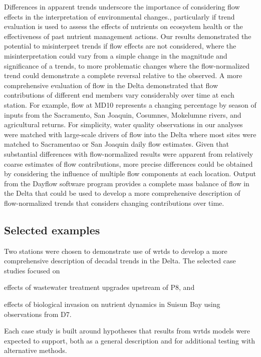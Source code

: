 \documentclass[journal = esthag, manuscript = article]{achemso}\usepackage[]{graphicx}\usepackage[]{color}
\begin{document}
Differences in apparent trends underscore the importance of considering flow effects in the interpretation of environmental changes., particularly if trend evaluation is used to assess the effects of nutrients on ecosystem health or the effectiveness of past nutrient management actions.  Our results demonstrated the potential to misinterpret trends if flow effects are not considered, where the misinterpretation could vary from a simple change in the magnitude and significance of a trends, to more problematic changes where the flow-normalized trend could demonstrate a complete reversal relative to the observed. A more comprehensive evaluation of flow in the Delta demonstrated that flow contributions of different end members vary considerably over time at each station\cite{Novick15}.  For example, flow at MD10 represents a changing percentage by season of inputs from the Sacramento, San Joaquin, Cosumnes, Mokelumne rivers, and agricultural returns.   For simplicity, water quality observations in our analyses were matched with large-scale drivers of flow into the Delta where most sites were matched to Sacramentao or San Joaquin daily flow estimates.  Given that substantial differences with flow-normalized results were apparent from relatively coarse estimates of flow contributions, more precise differences could be obtained by considering the influence of multiple flow components at each location. Output from the Dayflow software program\cite{IEP16} provides a complete mass balance of flow in the Delta that could be used to develop a more comprehensive description of flow-normalized trends that considers changing contributions over time.  

\subsection{Selected examples}

Two stations were chosen to demonstrate use of \ac{wrtds} to develop a more comprehensive description of decadal trends in the Delta.  The selected case studies focused on \begin{inparaenum}[1\upshape)]
\item effects of wastewater treatment upgrades upstream of P8, and
\item effects of biological invasion on nutrient dynamics in Suisun Bay using observations from D7.
\end{inparaenum}
Each case study is built around hypotheses that results from \ac{wrtds} models were expected to support, both as a general description and for additional testing with alternative methods. 
\end{document}
